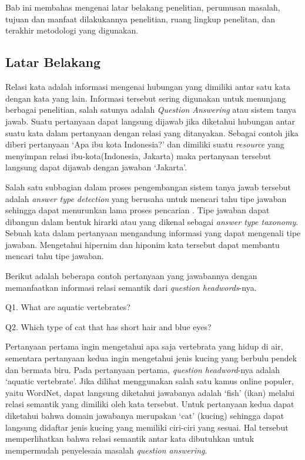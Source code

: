 \chapter{\babSatu}
Bab ini membahas mengenai latar belakang penelitian, perumusan masalah, tujuan dan manfaat dilakukannya penelitian, ruang lingkup penelitan, dan terakhir metodologi yang digunakan. 


\section{Latar Belakang}
Relasi kata adalah informasi mengenai hubungan yang dimiliki antar satu kata dengan kata yang lain. Informasi tersebut sering digunakan untuk menunjang berbagai penelitian, salah satunya adalah \textit{Question Answering} atau sistem tanya jawab. Suatu pertanyaan dapat langsung dijawab jika diketahui hubungan antar suatu kata dalam pertanyaan dengan relasi yang ditanyakan. Sebagai contoh jika diberi pertanyaan `Apa ibu kota Indonesia?' dan dimiliki suatu \textit{resource} yang menyimpan relasi ibu-kota(Indonesia, Jakarta) maka pertanyaan tersebut langsung dapat dijawab dengan jawaban `Jakarta'.

Salah satu subbagian dalam proses pengembangan sistem tanya jawab tersebut adalah \textit{answer type detection} yang berusaha untuk mencari tahu tipe jawaban sehingga dapat menurunkan lama proses pencarian \citep{jurafsky2000speech}. 
Tipe jawaban dapat dibangun dalam bentuk hirarki atau yang dikenal sebagai \textit{answer type taxonomy}. Sebuah kata dalam pertanyaan mengandung informasi yang dapat mengenali tipe jawaban. Mengetahui hipernim dan hiponim kata tersebut dapat membantu mencari tahu tipe jawaban.

Berikut adalah beberapa contoh pertanyaan yang jawabannya dengan memanfaatkan informasi relasi semantik dari \textit{question headwords}-nya.

Q1. What are aquatic vertebrates?

Q2. Which type of cat that has short hair and blue eyes?

\noindent Pertanyaan pertama ingin mengetahui apa saja vertebrata yang hidup di air, sementara pertanyaan kedua ingin mengetahui jenis kucing yang berbulu pendek dan bermata biru. Pada pertanyaan pertama, \textit{question headword}-nya adalah `aquatic vertebrate'. Jika dilihat menggunakan salah satu kamus online populer, yaitu WordNet, dapat langsung diketahui jawabanya adalah `fish' (ikan) melalui relasi semantik yang dimiliki oleh kata tersebut. Untuk pertanyaan kedua dapat diketahui bahwa domain jawabanya merupakan `cat' (kucing) sehingga dapat langsung didaftar jenis kucing yang memiliki ciri-ciri yang sesuai. Hal tersebut memperlihatkan bahwa relasi semantik antar kata dibutuhkan untuk mempermudah penyelesaia masalah \textit{question answering}. 


